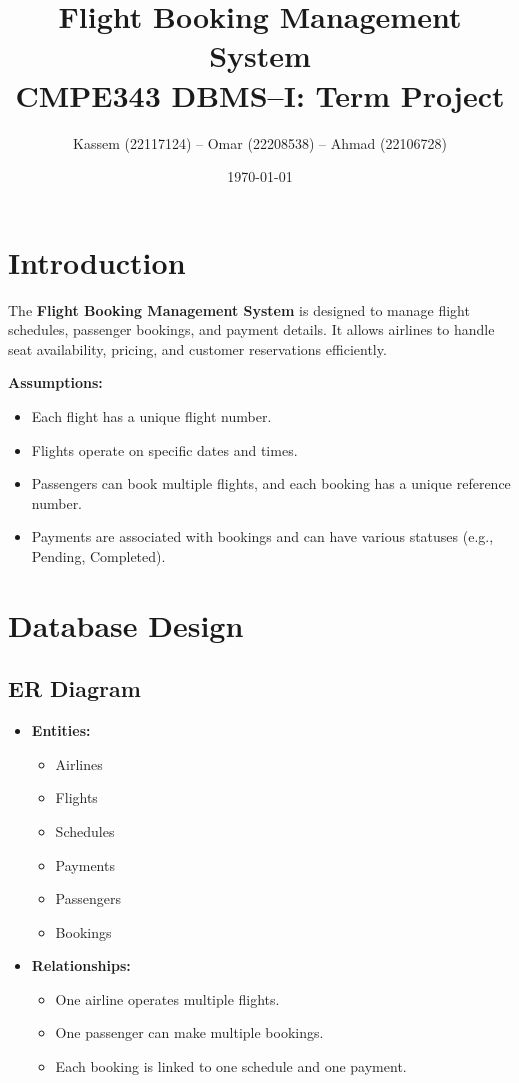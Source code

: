 \documentclass[14pt,a4paper]{extarticle}
\title{\textbf{Flight Booking Management System}\\
       \large CMPE343 DBMS--I: Term Project}
\author{
    Kassem (22117124) -- Omar (22208538) -- Ahmad (22106728)
}
\date{\today}
\begin{document}
\maketitle
\tableofcontents

\newpage

\section{Introduction}

The \textbf{Flight Booking Management System} is designed to manage flight schedules, passenger bookings, and payment details. It allows airlines to handle seat availability, pricing, and customer reservations efficiently.

\textbf{Assumptions:}
\begin{itemize}
    \item Each flight has a unique flight number.
    \item Flights operate on specific dates and times.
    \item Passengers can book multiple flights, and each booking has a unique reference number.
    \item Payments are associated with bookings and can have various statuses (e.g., Pending, Completed).
\end{itemize}

\newpage

\section{Database Design}

\subsection{ER Diagram}

\begin{itemize}
    \item \textbf{Entities:}
    \begin{itemize}
    \item Airlines
    \item Flights
    \item Schedules
    \item Payments
    \item Passengers
    \item Bookings
    \end{itemize}
    \item \textbf{Relationships:}
        \begin{itemize}
            \item One airline operates multiple flights.
            \item One passenger can make multiple bookings.
            \item Each booking is linked to one schedule and one payment.
        \end{itemize}
\end{itemize}
\end{document}
